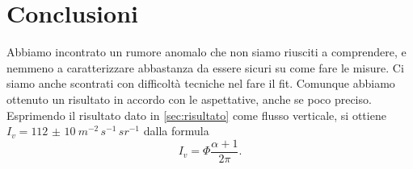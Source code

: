\section{Conclusioni}

Abbiamo incontrato un rumore anomalo che non siamo riusciti a comprendere,
e nemmeno a caratterizzare abbastanza da essere sicuri su come fare le misure.
Ci siamo anche scontrati con difficoltà tecniche nel fare il fit.
Comunque abbiamo ottenuto un risultato in accordo con le aspettative, anche se poco preciso.
Esprimendo il risultato dato in \autoref{sec:risultato} come flusso verticale,
si ottiene $I_v=\SI{112(10)}{m^{-2}\,s^{-1}\,sr^{-1}}$ dalla formula
\begin{equation*}
	I_v = \Phi \frac{\alpha+1}{2\pi}.
\end{equation*}
